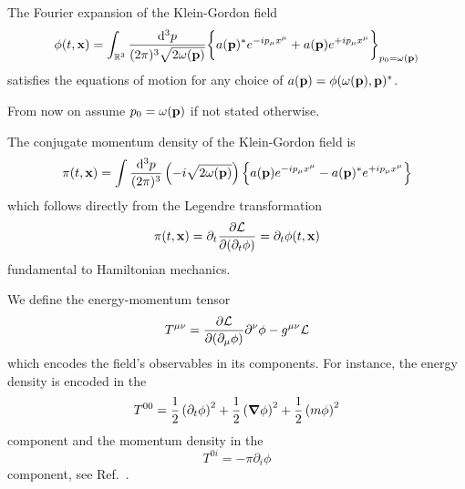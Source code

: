 \begin{lemma}
	The Fourier expansion of the Klein-Gordon field
	\begin{equation}
		\phi(t,\vb{x})
		=
		\int_{\mathbb{R}^3}\frac{\dd[3]{p}}{(2\pi)^3\sqrt{2\omega(\vb{p})}}
		\biggl\{
			a(\vb{p})^*
			e^{-ip_\mu x^\mu}
			+
			a(\vb{p})
			e^{+ip_\mu x^\mu}
		\biggr\}_{p_0=\omega(\vb{p})}
	\end{equation}
	satisfies the equations of motion for any choice of $a(\vb{p})=\phi(\omega(\vb{p}),\vb{p})^*$.
\end{lemma}

\begin{remark}
	From now on assume $p_0=\omega(\vb{p})$ if not stated otherwise.
\end{remark}

\begin{corollary}
	The conjugate momentum density of the Klein-Gordon field is
	\begin{equation}
		\pi(t,\vb{x})
		=
		\int\frac{\dd[3]{p}}{(2\pi)^3}
		\left(-i\sqrt{2\omega(\vb{p})}\right)
		\left\{
			a(\vb{p})
			e^{-ip_\mu x^\mu}
			-
			a(\vb{p})^*
			e^{+ip_\mu x^\mu}
		\right\}
	\end{equation}
	which follows directly from the Legendre transformation
	\begin{equation}
		\pi(t,\vb{x})
		=
		\partial_t\pdv{\mathcal{L}}{(\partial_t\phi)}
		=
		\partial_t\phi(t,\vb{x})
	\end{equation}
	fundamental to Hamiltonian mechanics.
\end{corollary}

\begin{definition}
	We define the energy-momentum tensor
	\begin{equation}
		T^{\mu\nu}
		=
		\pdv{\mathcal{L}}{(\partial_\mu\phi)}\partial^\nu\phi
		-
		g^{\mu\nu}\mathcal{L}
		\label{eq:energy_momentum_tensor}
	\end{equation}
	which encodes the field's observables in its components.
	For instance, the energy density is encoded in the
	\begin{equation*}
		T^{00}
		=
		\frac{1}{2}
		\left(\partial_t\phi\right)^2
		+
		\frac{1}{2}
		\left(\grad\phi\right)^2
		+
		\frac{1}{2}
		\left(m\phi\right)^2		
	\end{equation*}
	component and the momentum density in the
	\begin{equation*}
		T^{0i}
		=
		-\pi\partial_i\phi		
	\end{equation*}
	component, see Ref.~\cite{Peskin1995}.
\end{definition}

